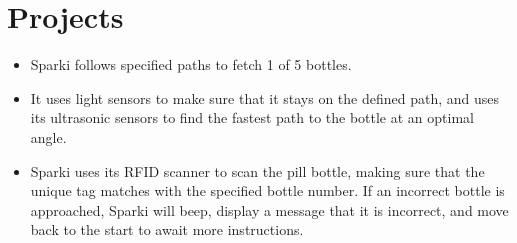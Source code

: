 \documentclass[10pt,a4paper,sans]{moderncv} %
\begin{document}
\section {Projects}
\begin{itemize}
\vspace{-5mm}
\item{Sparki follows specified paths to fetch 1 of 5 bottles.} 
\item{It uses light sensors to make sure that it stays on the defined path, and uses its ultrasonic sensors to find the fastest path to the bottle at an optimal angle.} 
\item{Sparki uses its RFID scanner to scan the pill bottle, making sure that the unique tag  matches with the specified bottle number. If an incorrect bottle is approached, Sparki will beep, display a message that it is incorrect, and move back to the start to await more instructions.}
\end{itemize}
\end{document}
